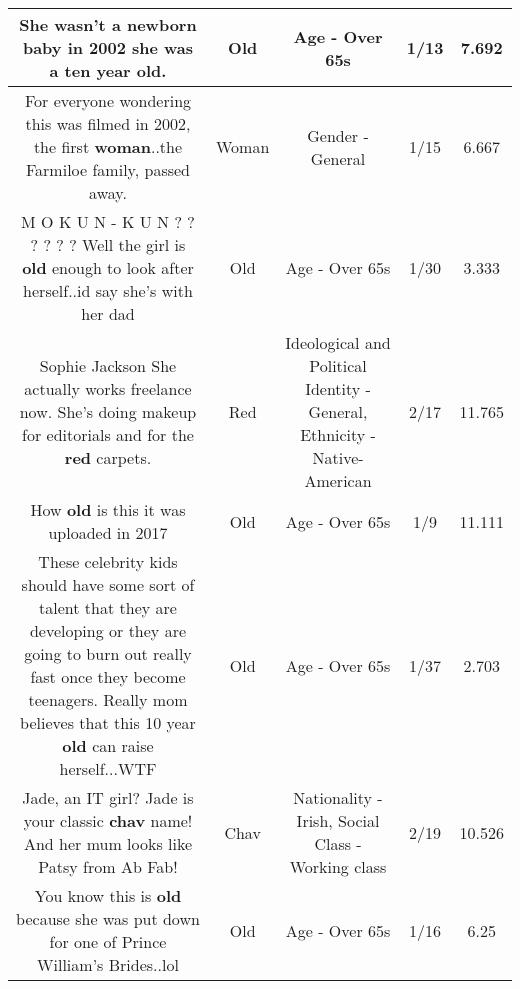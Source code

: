 \documentclass[11pt]{article}
\newlength\mylength
\begin{document}
\begin{center}
\begin{longtable}{|C{.65\mylength}|C{.30\mylength}|C{.12\mylength}|C{.12\mylength}|C{.12\mylength}|}
  \small She wasn't a newborn baby in 2002 she was a ten year \textbf{old}.\normalsize   & Old & Age - Over 65s & 1/13 & 7.692 \\  \hline
  \small For everyone wondering this was filmed in 2002, the first \textbf{woman}..the Farmiloe family, passed away.\normalsize   & Woman & Gender - General & 1/15 & 6.667 \\  \hline
  \small M O K U N - K U N ? ? ? ? ? ? Well the girl is \textbf{old} enough to look after herself..id say she's with her dad\normalsize   & Old & Age - Over 65s & 1/30 & 3.333 \\  \hline
  \small Sophie Jackson She actually works freelance now. She's doing makeup for editorials and for the \textbf{r\textbf{ed}} carpets.\normalsize   & Red &  Ideological and Political Identity - General, Ethnicity - Native-American & 2/17 & 11.765 \\  \hline
  \small How \textbf{old} is this it was uploaded in 2017\normalsize   & Old & Age - Over 65s & 1/9 & 11.111 \\  \hline
  \small These celebrity kids should have some sort of talent that they are developing or they are going to burn out really fast once they become teenagers. Really mom believes that this 10 year \textbf{old} can raise herself...WTF\normalsize   & Old & Age - Over 65s & 1/37 & 2.703 \\  \hline
  \small Jade, an IT girl?  Jade is your classic \textbf{c\textbf{hav}} name! And her mum looks like Patsy from Ab Fab!\normalsize   & Chav & Nationality - Irish, Social Class - Working class & 2/19 & 10.526 \\  \hline
  \small You know this is \textbf{old} because she was put down for one of Prince William's Brides..lol\normalsize   & Old & Age - Over 65s & 1/16 & 6.25 \\  \hline

\end{longtable}
\end{center}
\end{document}

